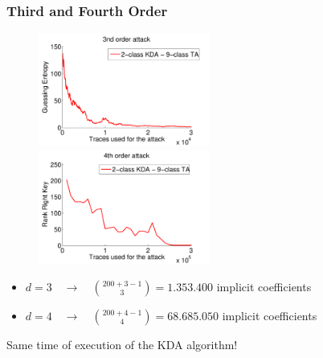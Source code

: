 \begin{frame}
\frametitle{Third and Fourth Order}
\begin{figure}
\includegraphics[width=0.5\textwidth]{figures/3order_only_9.pdf}
\includegraphics[width=0.5\textwidth]{figures/4order_only_9.pdf}
\end{figure}


\begin{itemize}
\item $d=3 \quad \longrightarrow \quad {{200+3-1}\choose{3}} = 1.353.400$ implicit coefficients
\item  $d=4 \quad \longrightarrow \quad {{200+4-1}\choose{4}} = 68.685.050$ implicit coefficients
\end{itemize}

Same time of execution of the KDA algorithm!

\end{frame}

%
%


